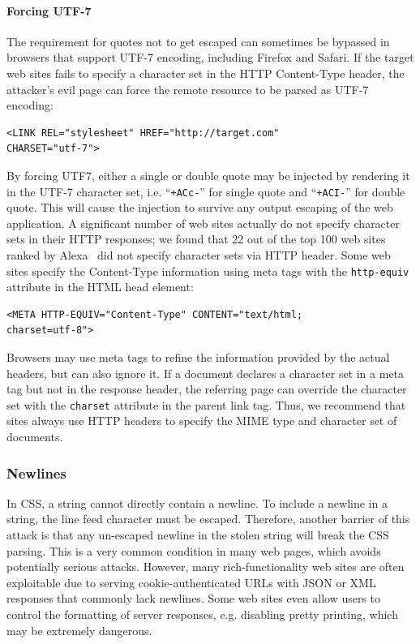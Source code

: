 \documentclass{acm_proc_article-sp}
\begin{document}
\paragraph{Forcing UTF-7}
The requirement for quotes not to get escaped can sometimes be bypassed in browsers that support UTF-7 encoding, including Firefox and Safari. If the target web sites fails to specify a character set in the HTTP Content-Type header, the attacker's evil page can force the remote resource to be parsed as UTF-7 encoding:
\begin{verbatim}
<LINK REL="stylesheet" HREF="http://target.com"
CHARSET="utf-7">
\end{verbatim}
By forcing UTF7, either a single or double quote may be injected by rendering it in the UTF-7 character set, i.e. ``\texttt{+ACc-}'' for single quote and ``\texttt{+ACI-}'' for double quote. This will cause the injection to survive any output escaping of the web application. A significant number of web sites actually do not specify character sets in their HTTP responses; we found that 22 out of the top 100 web sites ranked by Alexa~\cite{alexa} did not specify character sets via HTTP header. Some web sites specify the Content-Type information using meta tags with the \texttt{http-equiv} attribute in the HTML head element:
\begin{verbatim}
<META HTTP-EQUIV="Content-Type" CONTENT="text/html;
charset=utf-8">
\end{verbatim}
Browsers may use meta tags to refine the information provided by the actual headers, but can also ignore it. If a document declares a character set in a meta tag but not in the response header, the referring page can override the character set with the \texttt{charset} attribute in the parent link tag. Thus, we recommend that sites always use HTTP headers to specify the MIME type and character set of documents.

\subsubsection{Newlines}
In CSS, a string cannot directly contain a newline. To include a newline in a string, the line feed character must be escaped. Therefore, another barrier of this attack is that any un-escaped newline in the stolen string will break the CSS parsing. This is a very common condition in many web pages, which avoids potentially serious attacks. However, many rich-functionality web sites are often exploitable due to serving cookie-authenticated URLs with JSON or XML responses that commonly lack newlines. Some web sites even allow users to control the formatting of server responses, e.g. disabling pretty printing, which may be extremely dangerous.
\end{document}
